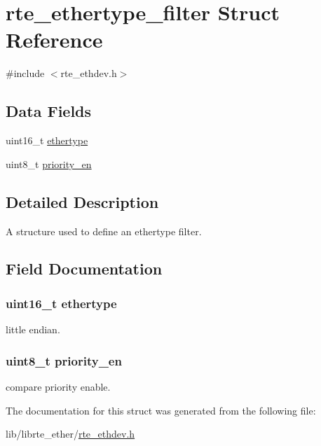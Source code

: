 \hypertarget{structrte__ethertype__filter}{}\section{rte\+\_\+ethertype\+\_\+filter Struct Reference}
\label{structrte__ethertype__filter}


{\ttfamily \#include $<$rte\+\_\+ethdev.\+h$>$}

\subsection*{Data Fields}
\begin{DoxyCompactItemize}
\item 
uint16\+\_\+t \hyperlink{structrte__ethertype__filter_aa9296c58dc24c63c4ee927db394a97d7}{ethertype}
\item 
uint8\+\_\+t \hyperlink{structrte__ethertype__filter_a2e843e998f4332dde01c16c989e5d391}{priority\+\_\+en}
\end{DoxyCompactItemize}


\subsection{Detailed Description}
A structure used to define an ethertype filter. 

\subsection{Field Documentation}
\hypertarget{structrte__ethertype__filter_aa9296c58dc24c63c4ee927db394a97d7}{}
\subsubsection[{ethertype}]{\setlength{\rightskip}{0pt plus 5cm}uint16\+\_\+t ethertype}\label{structrte__ethertype__filter_aa9296c58dc24c63c4ee927db394a97d7}
little endian. \hypertarget{structrte__ethertype__filter_a2e843e998f4332dde01c16c989e5d391}{}
\subsubsection[{priority\+\_\+en}]{\setlength{\rightskip}{0pt plus 5cm}uint8\+\_\+t priority\+\_\+en}\label{structrte__ethertype__filter_a2e843e998f4332dde01c16c989e5d391}
compare priority enable. 

The documentation for this struct was generated from the following file\+:\begin{DoxyCompactItemize}
\item 
lib/librte\+\_\+ether/\hyperlink{rte__ethdev_8h}{rte\+\_\+ethdev.\+h}\end{DoxyCompactItemize}
